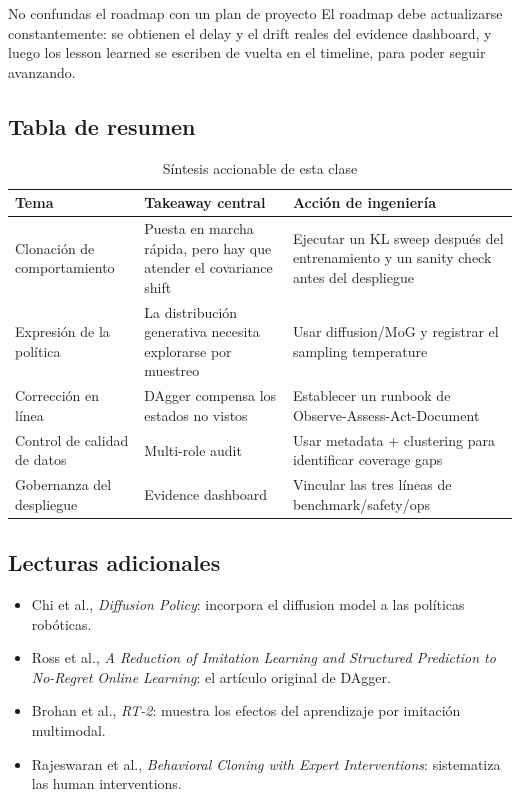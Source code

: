\begin{warningbox}{No confundas el roadmap con un plan de proyecto}
El roadmap debe actualizarse constantemente: se obtienen el delay y el drift reales del evidence dashboard, y luego los lesson learned se escriben de vuelta en el timeline, para poder seguir avanzando.
\end{warningbox}

\subsection{Tabla de resumen}

\begin{table}[H]
\centering
\begin{tabular}{p{} p{} p{}}
\toprule
Tema & Takeaway central & Acción de ingeniería \\
\midrule
Clonación de comportamiento & Puesta en marcha rápida, pero hay que atender el covariance shift & Ejecutar un KL sweep después del entrenamiento y un sanity check antes del despliegue \\
Expresión de la política & La distribución generativa necesita explorarse por muestreo & Usar diffusion/MoG y registrar el sampling temperature \\
Corrección en línea & DAgger compensa los estados no vistos & Establecer un runbook de Observe-Assess-Act-Document \\
Control de calidad de datos & Multi-role audit & Usar metadata + clustering para identificar coverage gaps \\
Gobernanza del despliegue & Evidence dashboard & Vincular las tres líneas de benchmark/safety/ops \\
\bottomrule
\end{tabular}
\caption{Síntesis accionable de esta clase}
\end{table}

\subsection{Lecturas adicionales}
\begin{itemize}
    \item Chi et al., \textit{Diffusion Policy}: incorpora el diffusion model a las políticas robóticas.
    \item Ross et al., \textit{A Reduction of Imitation Learning and Structured Prediction to No-Regret Online Learning}: el artículo original de DAgger.
    \item Brohan et al., \textit{RT-2}: muestra los efectos del aprendizaje por imitación multimodal.
    \item Rajeswaran et al., \textit{Behavioral Cloning with Expert Interventions}: sistematiza las human interventions.
\end{itemize}

